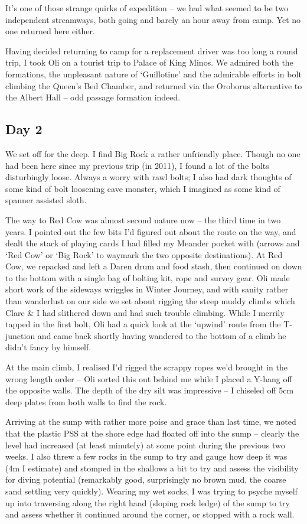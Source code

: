 It's one of those strange quirks of expedition -- we had what seemed to
be two independent streamways, both going and barely an hour away from
camp. Yet no one returned here either.

Having decided returning to camp for a replacement driver was too long a
round trip, I took Oli on a tourist trip to Palace of King Minos. We
admired both the formations, the unpleasant nature of `Guillotine' and
the admirable efforts in bolt climbing the Queen's Bed Chamber, and
returned via the Oroborus alternative to the Albert Hall -- odd passage
formation indeed.

\hypertarget{day-2}{%
\subsection{Day 2}\label{day-2}}

We set off for the deep. I find Big Rock a rather unfriendly place.
Though no one had been here since my previous trip (in 2011), I found a
lot of the bolts disturbingly loose. Always a worry with rawl bolts; I
also had dark thoughts of some kind of bolt loosening cave monster,
which I imagined as some kind of spanner assisted sloth.

The way to Red Cow was almost second nature now -- the third time in two
years. I pointed out the few bits I'd figured out about the route on the
way, and dealt the stack of playing cards I had filled my Meander pocket
with (arrows and `Red Cow' or `Big Rock' to waymark the two opposite
destinations). At Red Cow, we repacked and left a Daren drum and food
stash, then continued on down to the bottom with a single bag of bolting
kit, rope and survey gear. Oli made short work of the sideways wriggles
in Winter Journey, and with sanity rather than wanderlust on our side we
set about rigging the steep muddy climbs which Clare \& I had slithered
down and had such trouble climbing. While I merrily tapped in the first
bolt, Oli had a quick look at the `upwind' route from the T-junction and
came back shortly having wandered to the bottom of a climb he didn't
fancy by himself.

At the main climb, I realised I'd rigged the scrappy ropes we'd brought
in the wrong length order -- Oli sorted this out behind me while I
placed a Y-hang off the opposite walls. The depth of the dry silt was
impressive -- I chiseled off 5cm deep plates from both walls to find the
rock.

Arriving at the sump with rather more poise and grace than last time, we
noted that the plastic PSS at the shore edge had floated off into the
sump -- clearly the level had increased (at least minutely) at some
point during the previous two weeks. I also threw a few rocks in the
sump to try and gauge how deep it was (4m I estimate) and stomped in the
shallows a bit to try and assess the visibility for diving potential
(remarkably good, surprisingly no brown mud, the coarse sand settling
very quickly). Wearing my wet socks, I was trying to psyche myself up
into traversing along the right hand (sloping rock ledge) of the sump to
try and assess whether it continued around the corner, or stopped with a
rock wall.

